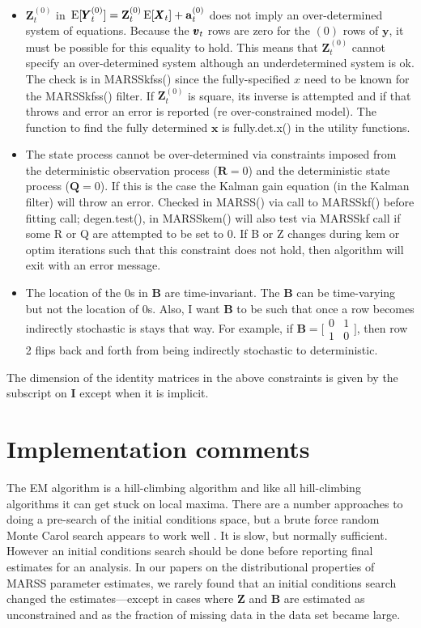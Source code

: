 \documentclass[]{article}
\def\ZZ{\mbox{$\mathbf Z$}}	\def\zz{\mbox{$\mathbf z$}}
\def\BB{\mbox{$\mathbf B$}}	\def\bb{\mbox{$\mathbf b$}}
\def\II{\mbox{$\mathbf I$}} \def\ii{\mbox{$\mathbf i$}}
\def\QQ{\mbox{$\mathbf Q$}}	 \def\qq{\mbox{$\mathbf q$}}
\def\RR{\mbox{$\mathbf R$}}	 \def\rr{\mbox{$\mathbf r$}}
\def\XX{\mbox{$\pmb{X}$}}	\def\xx{\mbox{$\pmb{x}$}}
\def\YY{\mbox{$\pmb{Y}$}}	\def\yy{\mbox{$\pmb{y}$}}
\def\E{\,\textup{\textrm{E}}}
\begin{document}
\begin{itemize}
\item $\ZZ_t^{(0)}$ in $\E[\YY_t^{(0)}]=\ZZ_t^{(0)}\E[\XX_t]+\aa_t^{(0)}$ does not imply an over-determined system of equations.  Because the $\mbox{$\pmb{v}$}_t$ rows are zero for the ${(0)}$ rows of $\yy$, it must be possible for this equality to hold.  This means that $\ZZ_t^{(0)}$ cannot specify an over-determined system although an underdetermined system is ok.  The check is in MARSSkfss() since the fully-specified $x$ need to be known for the MARSSkfss() filter. If $\ZZ_t^{(0)}$ is square, its inverse is attempted and if that throws and error an error is reported (re over-constrained model). The function to find the fully determined $\xx$ is fully.det.x() in the utility functions.
\item The state process cannot be over-determined via constraints imposed from the deterministic observation process ($\RR=0$) and the deterministic state process ($\QQ=0$).  If this is the case the Kalman gain equation (in the Kalman filter) will throw an error.  Checked in MARSS() via call to MARSSkf() before fitting call; degen.test(), in MARSSkem() will also test via MARSSkf call if some R or Q are attempted to be set to 0.  If B or Z changes during kem or optim iterations such that this constraint does not hold, then algorithm will exit with an error message.
\item The location of the 0s in $\BB$ are time-invariant.  The $\BB$ can be time-varying but not the location of 0s.  Also, I want $\BB$ to be such that once a row becomes indirectly stochastic is stays that way.  For example, if $\BB=\bigl[ \begin{smallmatrix}
0&1\\ 1&0 \end{smallmatrix} \bigr]$, then row 2 flips back and forth from being indirectly stochastic to deterministic.
\end{itemize}
The dimension of the identity matrices in the above constraints is given by the subscript on $\II$ except when it is implicit.

\section{Implementation comments}\label{sec:implementation}
The EM algorithm is a hill-climbing algorithm and like all hill-climbing algorithms it can get stuck on local maxima.  There are a number approaches to doing a pre-search of the initial conditions space, but a brute force  random Monte Carol search appears to work well \citep{Biernackietal2003}.  It is slow, but normally sufficient.  However an initial conditions search should be done before reporting final estimates for an analysis.  In our papers on the distributional properties of  MARSS parameter estimates, we rarely found that an initial conditions search changed the estimates---except in cases where $\ZZ$ and $\BB$ are estimated as unconstrained and as the fraction of missing data in the data set became large.
\end{document}
